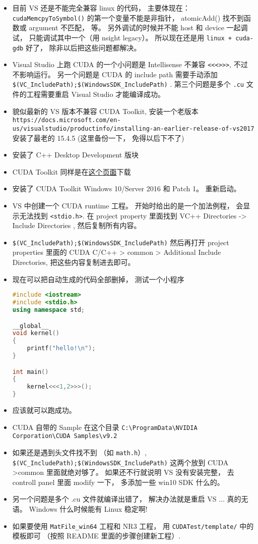 
\begin{itemize}
\item 目前 VS 还是不能完全兼容 linux 的代码， 主要体现在： \verb|cudaMemcpyToSymbol()| 的第一个变量不能是非指针， atomicAdd() 找不到函数或 argument 不匹配， 等。 另外调试的时候并不能 host 和 device 一起调试， 只能调试其中一个（用 nsight legacy）。 所以现在还是用 \verb|linux + cuda-gdb| 好了， 除非以后把这些问题都解决。
\item Visual Studio 上跑 CUDA 的一个小问题是 Intellisense 不兼容 \verb`<<<>>>`, 不过不影响运行。 另一个问题是 CUDA 的 include path 需要手动添加 \verb`$(VC_IncludePath);$(WindowsSDK_IncludePath)` . 第三个问题是多个 \verb`.cu` 文件的工程需要重启 Visual Studio 才能编译成功。
\item 貌似最新的 VS 版本不兼容 CUDA Toolkit, 安装一个老版本 \verb|https://docs.microsoft.com/en-us/visualstudio/productinfo/installing-an-earlier-release-of-vs2017| 安装了最老的 15.4.5 (这里备份一下， 免得以后下不了)
\item 安装了 C++ Desktop Development 版块
\item CUDA Toolkit 同样是在\href{https://developer.nvidia.com/cuda-downloads}{这个页面}下载
\item 安装了 CUDA Toolkit Windows 10/Server 2016 和 Patch 1。 重新启动。
\item VS 中创建一个 CUDA runtime 工程。 开始时给出的是一个加法例程， 会显示无法找到 \verb`<stdio.h>`. 在 project property 里面找到 VC++ Directories -> Include Directories , 然后复制所有内容。
\item \verb|$(VC_IncludePath);$(WindowsSDK_IncludePath)| 然后再打开 project properties 里面的 CUDA C/C++ >  common > Additional Include Directories, 把这些内容复制进去即可。
\item 现在可以把自动生成的代码全部删掉， 测试一个小程序
\begin{lstlisting}[language=cpp]
#include <iostream>
#include <stdio.h>
using namespace std;

__global__
void kernel()
{
	printf("hello!\n");
}

int main()
{
	kernel<<<1,2>>>();
}
\end{lstlisting}
\item 应该就可以跑成功。
\item CUDA 自带的 Sample 在这个目录 \verb|C:\ProgramData\NVIDIA Corporation\CUDA Samples\v9.2|
\item 如果还是遇到头文件找不到 （如 \verb`math.h`）, \verb`$(VC_IncludePath);$(WindowsSDK_IncludePath)` 这两个放到 CUDA >common 里面就绝对够了。 如果还不行就说明 VS 没有安装完整， 去 controll panel 里面 modify 一下， 多添加一些 win10 SDK 什么的。
\item 另一个问题是多个 .cu 文件就编译出错了， 解决办法就是重启 VS ... 真的无语。 Windows 什么时候能有 Linux 稳定啊!
\item 如果要使用 \verb|MatFile_win64| 工程和 NR3 工程， 用 \verb|CUDATest/template/| 中的模板即可 （按照 README 里面的步骤创建新工程）.
\end{itemize}
